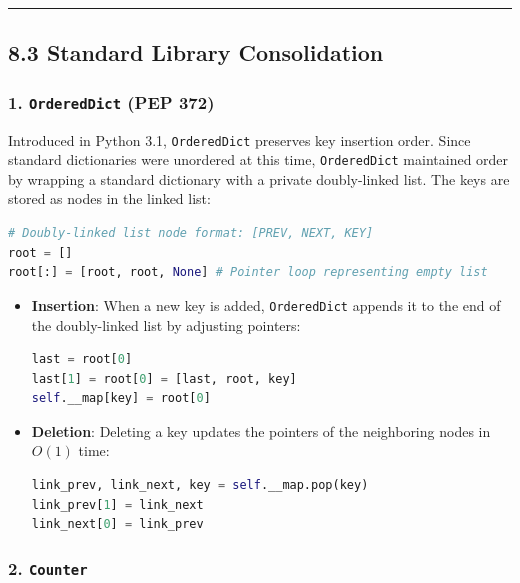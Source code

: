 \begin{center}\rule{0.5\linewidth}{0.5pt}\end{center}

\hypertarget{standard-library-consolidation}{%
\subsection{8.3 Standard Library
Consolidation}\label{standard-library-consolidation}}

\hypertarget{ordereddict-pep-372}{%
\subsubsection{\texorpdfstring{1. \texttt{OrderedDict} (PEP
372)}{1. OrderedDict (PEP 372)}}\label{ordereddict-pep-372}}

Introduced in Python 3.1, \passthrough{\lstinline!OrderedDict!}
preserves key insertion order. Since standard dictionaries were
unordered at this time, \passthrough{\lstinline!OrderedDict!} maintained
order by wrapping a standard dictionary with a private doubly-linked
list. The keys are stored as nodes in the linked list:

\begin{lstlisting}[language=Python]
# Doubly-linked list node format: [PREV, NEXT, KEY]
root = []
root[:] = [root, root, None] # Pointer loop representing empty list
\end{lstlisting}

\begin{itemize}
\item
  \textbf{Insertion}: When a new key is added,
  \passthrough{\lstinline!OrderedDict!} appends it to the end of the
  doubly-linked list by adjusting pointers:

\begin{lstlisting}[language=Python]
last = root[0]
last[1] = root[0] = [last, root, key]
self.__map[key] = root[0]
\end{lstlisting}
\item
  \textbf{Deletion}: Deleting a key updates the pointers of the
  neighboring nodes in \(O(1)\) time:

\begin{lstlisting}[language=Python]
link_prev, link_next, key = self.__map.pop(key)
link_prev[1] = link_next
link_next[0] = link_prev
\end{lstlisting}
\end{itemize}

\hypertarget{counter}{%
\subsubsection{\texorpdfstring{2.
\texttt{Counter}}{2. Counter}}\label{counter}}

